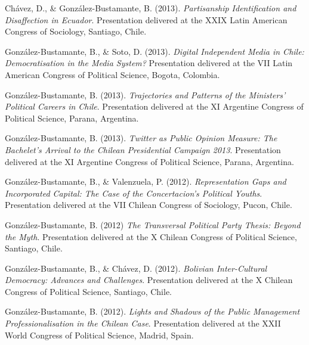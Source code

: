 \begin{publications}
\begin{benumerate}{72}
\item{\small Chávez, D., \& González-Bustamante, B. (2013). {\itshape Partisanship Identification and Disaffection in Ecuador}. Presentation delivered at the XXIX Latin American Congress of Sociology, Santiago, Chile.}\vspace{1mm}

\item{\small González-Bustamante, B., \& Soto, D. (2013). {\itshape Digital Independent Media in Chile: Democratisation in the Media System?} Presentation delivered at the VII Latin American Congress of Political Science, Bogota, Colombia.}\vspace{1mm}

\item{\small González-Bustamante, B. (2013). {\itshape Trajectories and Patterns of the Ministers' Political Careers in Chile}. Presentation delivered at the XI Argentine Congress of Political Science, Parana, Argentina.}\vspace{1mm}

\item{\small González-Bustamante, B. (2013). {\itshape Twitter as Public Opinion Measure: The Bachelet's Arrival to the Chilean Presidential Campaign 2013}. Presentation delivered at the XI Argentine Congress of Political Science, Parana, Argentina.}\vspace{1mm}

\item{\small González-Bustamante, B., \& Valenzuela, P. (2012). {\itshape Representation Gaps and Incorporated Capital: The Case of the Concertacion's Political Youths}. Presentation delivered at the VII Chilean Congress of Sociology, Pucon, Chile.}\vspace{1mm}

\item{\small González-Bustamante, B. (2012) {\itshape The Transversal Political Party Thesis: Beyond the Myth}. Presentation delivered at the X Chilean Congress of Political Science, Santiago, Chile.}\vspace{1mm}

\item{\small González-Bustamante, B., \& Chávez, D. (2012). {\itshape Bolivian Inter-Cultural Democracy: Advances and Challenges}. Presentation delivered at the X Chilean Congress of Political Science, Santiago, Chile.}\vspace{1mm}

\item{\small González-Bustamante, B. (2012). {\itshape Lights and Shadows of the Public Management Professionalisation in the Chilean Case}. Presentation delivered at the XXII World Congress of Political Science, Madrid, Spain.}\vspace{1mm}


\end{benumerate}
\end{publications}
